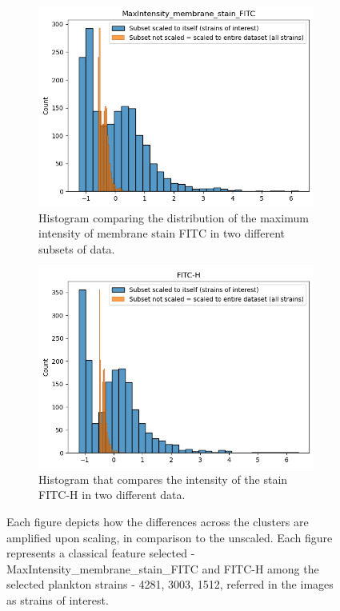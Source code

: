 \documentclass[12pt,a4paper]{article}
\begin{document}
\begin{figure}
  \centering
  \begin{subfigure}{0.45\linewidth}
    \includegraphics[width=\linewidth]{Figures/maxintensitymembranestain_fitc_scaledandunscaled_planktondata.png}
    \caption{Histogram comparing the distribution of the maximum intensity of membrane stain FITC in two different subsets of data.}
    \label{multifig2:image_a}
  \end{subfigure}
  \hfill
  \begin{subfigure}{0.4\linewidth}
    \includegraphics[width=\linewidth]{Figures/fitc-h_scaledandunscaled_planktondata.png}
    \caption{Histogram that compares the intensity of the stain FITC-H in two different data.}
    \label{multifig2:image_b}
  \end{subfigure}
  \caption{Each figure depicts how the differences across the clusters are amplified upon scaling, in comparison to the unscaled. Each figure represents a classical feature selected - MaxIntensity\_membrane\_stain\_FITC and FITC-H among the selected plankton strains - 4281, 3003, 1512, referred in the images as strains of interest.}
  \label{multifig2:overall_figure}
\end{figure}
\end{document}

